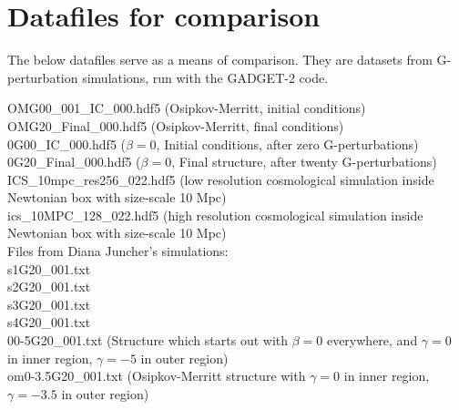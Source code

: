 \section{Datafiles for comparison}
The below datafiles serve as a means of comparison. They are datasets from G-perturbation simulations, run with the GADGET-2 code. \\
 
\begin{flushleft}
OMG00\_001\_IC\_000.hdf5 (Osipkov-Merritt, initial conditions) \\
OMG20\_Final\_000.hdf5 (Osipkov-Merritt, final conditions) \\
0G00\_IC\_000.hdf5 ($\beta = 0$, Initial conditions, after zero G-perturbations) \\
0G20\_Final\_000.hdf5 ($ \beta = 0 $, Final structure, after twenty G-perturbations) \\
ICS\_10mpc\_res256\_022.hdf5 (low resolution cosmological simulation inside Newtonian box with size-scale 10 Mpc) \\
ics\_10MPC\_128\_022.hdf5 (high resolution cosmological simulation inside Newtonian box with size-scale 10 Mpc) \\
Files from Diana Juncher's simulations: \\
s1G20\_001.txt \\
s2G20\_001.txt \\
s3G20\_001.txt \\
s4G20\_001.txt \\
00-5G20\_001.txt (Structure which starts out with $\beta = 0$ everywhere, and $\gamma = 0$ in inner region, $\gamma = -5$ in outer region) \\
om0-3.5G20\_001.txt (Osipkov-Merritt structure with $\gamma = 0$ in inner region, $\gamma = -3.5$ in outer region) \\
\end{flushleft}